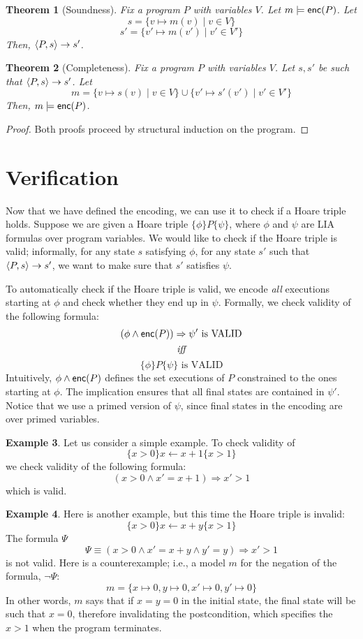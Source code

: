 \documentclass{amsart}
\newtheorem{theorem}{Theorem}[section]
\theoremstyle{definition}
\newtheorem{example}[theorem]{Example}
\theoremstyle{remark}
\numberwithin{equation}{section}
\begin{document}
\begin{theorem}[Soundness]
  Fix a program $P$ with variables $V$.
  Let $m \models \mathsf{enc}(P)$.
  Let $$s = \{v \mapsto m(v) \mid v \in V\}$$
  $$s' = \{v' \mapsto m(v') \mid v' \in V'\}$$
  Then, $\langle P,s \rangle \to s'$.
\end{theorem}

\begin{theorem}[Completeness]
  Fix a program $P$ with variables $V$.
  Let $s,s'$ be such that
  $\langle P,s \rangle \to s'$.
  Let
  $$m = \{v\mapsto s(v) \mid v \in V\} \cup \{v'\mapsto s'(v') \mid v' \in V'\}$$
  Then, $m \models \mathsf{enc}(P)$.
\end{theorem}

\begin{proof}
  Both proofs proceed by structural induction
  on the program.
\end{proof}

\section{Verification}
Now that we have defined the encoding,
we can use it to check if a Hoare triple
holds.
Suppose we are given a Hoare triple
$\{\phi\} P \{\psi\}$,
where $\phi$ and $\psi$ are LIA formulas
over program variables.
We would like to check if the Hoare triple is valid;
informally, for any state $s$ satisfying $\phi$,
for any state $s'$ such that $\langle P,s \rangle \to s'$,
we want to make sure that $s'$ satisfies $\psi$.

To automatically check if the Hoare triple
is valid, we encode \emph{all} executions starting at
$\phi$ and check whether they end up in $\psi$.
Formally, we check validity of the following formula:
$$ (\phi \land \mathsf{enc}(P)) \Rightarrow \psi' \text{ is VALID}$$
$$\emph{iff}$$
$$\{\phi\} P \{\psi\} \text{ is VALID}$$
Intuitively, $\phi \land \mathsf{enc}(P)$ defines
the set executions of $P$ constrained to the ones
starting at $\phi$. The implication ensures
that all final states are contained in $\psi'$.
Notice that we use a primed version of $\psi$,
since final states in the encoding are over primed variables.

\begin{example}
  Let us consider a simple example.
  To check validity of
  $$\{x > 0\} x \gets x + 1 \{x > 1\}$$
  we check validity of the following formula:
  $$(x > 0 \land x' = x + 1) \Rightarrow x' > 1$$
  which is valid.
\end{example}

\begin{example}
  Here is another example, but this time the Hoare triple
  is invalid:
  $$\{x > 0\} x \gets x + y \{x > 1\}$$
  The formula $\Psi$
    $$\Psi \equiv (x > 0 \land x' = x + y \land y'=y) \Rightarrow x' > 1$$
    is not valid.
    Here is a counterexample; i.e., a model $m$ for the negation
    of the formula, $\neg\Psi$:
    $$m = \{x \mapsto 0, y \mapsto 0, x' \mapsto 0, y' \mapsto 0\}$$
    In other words, $m$ says that if $x = y = 0$
    in the initial state, the final state will be such that
    $x = 0$, therefore invalidating the postcondition,
    which specifies the $x > 1$ when the program terminates.
\end{example}
\end{document}
